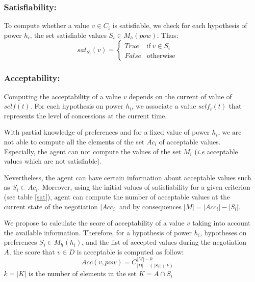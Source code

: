 \documentclass{llncs}
\begin{document}
	\subsubsection{Satisfiability:}
		To compute whether a value $v \in C_i$ is satisfiable, we check for each hypothesis of power $h_i$, the set satisfiable values $S_i \in M_h(pow)$.
		Thus: 
			\begin{equation}
			sat_{S_i}(v)= \left\{\begin{array}{ll}
			True	 & \mathrm{if\ }  v \in S_i\\
			False & \mathrm{otherwise}
			\end{array}\right.
			\end{equation}
	
	\subsubsection{Acceptability:}
		Computing the acceptability of a value $v$ depends on the current of value of $self(t)$. For each hypothesis on power $h_i$, we associate a value $self_i(t)$ that represents the level of concessions at the current time. 
		
		With partial knowledge of preferences and for a fixed value of power $h_i$, we are not able to compute all the elements of the set $Ac_i$ of acceptable values. Especially, the agent can not compute the values of the set $M_i$ (\emph{i.e} acceptable values which are not satisfiable). 
		
		Nevertheless, the agent can have certain information about acceptable values such as $ S_i \subset Ac_i$. Moreover, using the initial values of satisfiability for a given criterion (see table \ref{sat}), agent can compute the number of acceptable values at the current state of the negotiation $|Acc_i|$ and by consequences $|M| = |Acc_i| - |S_i|$. 
		
		We propose to calculate the score of acceptability of a value $v$ taking into account the available information. Therefore, for a hypothesis of power $h_i$, hypotheses on preferences $S_i \in M_h(h_i)$,  and the list of accepted values during the negotiation $A$, the score that $v \in D$ is acceptable is computed as follow: 
			\begin{equation}
					Acc(v, pow) = C_{|D|-(|S_i| + k)}^{|M| - k}
			\end{equation}
		$k = |K| $ is the number of elements in the set $K = A \cap \overline S_i$

 
	
\end{document}
